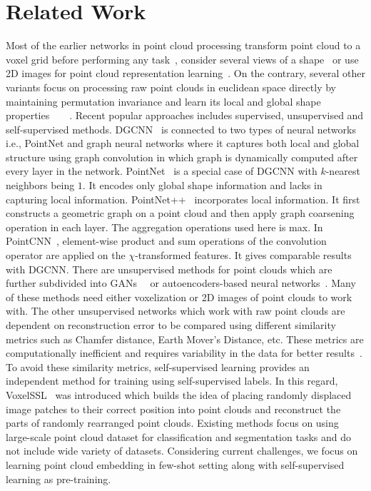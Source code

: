 \documentclass{article}
\begin{document}
\section{Related Work}
\label{related}
 Most of the earlier networks in point cloud processing transform point cloud to a voxel grid before performing any task~\cite{wu2016learning}, consider several views of a shape~\cite{su2015multi} or use 2D images for point cloud representation learning~\cite{insafutdinov2018unsupervised}. On the contrary, several other variants focus on processing raw point clouds in euclidean space directly by maintaining permutation invariance and learn its local and global shape properties~\cite{dgcnn}~\cite{qi2017pointnet}~\cite{qi2017pointnet++}~\cite{li2018pointcnn}. Recent popular approaches includes supervised, unsupervised and self-supervised methods. DGCNN~\cite{dgcnn} is connected to two types of neural networks i.e., PointNet and graph neural networks where it captures both local and global structure using graph convolution in which graph is dynamically computed after every layer in the network. PointNet~\cite{qi2017pointnet} is a special case of DGCNN with $k$-nearest neighbors being $1$. It encodes only global shape information and lacks in capturing local information. PointNet++~\cite{qi2017pointnet++} incorporates local information. It first constructs a geometric graph on a point cloud and then apply graph coarsening operation in each layer. The aggregation operations used here is max. In PointCNN~\cite{li2018pointcnn}, element-wise product and sum operations of the convolution operator are applied on the $\chi$-transformed features. It gives comparable results with DGCNN. There are unsupervised methods for point clouds which are further subdivided into GANs~\cite{achlioptas2018learning}~\cite{han2019view} or autoencoders-based neural networks~\cite{yang2018foldingnet}. Many of these methods need either voxelization or 2D images of point clouds to work with. The other unsupervised networks which work with raw point clouds are dependent on reconstruction error to be compared using different similarity metrics such as Chamfer distance, Earth Mover's Distance, etc. These metrics are computationally inefficient and requires variability in the data for better results~\cite{achlioptas2018learning}. To avoid these similarity metrics, self-supervised learning provides an independent method for training using self-supervised labels. In this regard, VoxelSSL~\cite{sauder2019self} was introduced which builds the idea of placing randomly displaced image patches to their correct position into point clouds and reconstruct the parts of randomly rearranged point clouds. Existing methods focus on using large-scale point cloud dataset for classification and segmentation tasks and do not include wide variety of datasets. Considering current challenges, we focus on learning point cloud embedding in few-shot setting along with self-supervised learning as pre-training.
\fi
\end{document}
